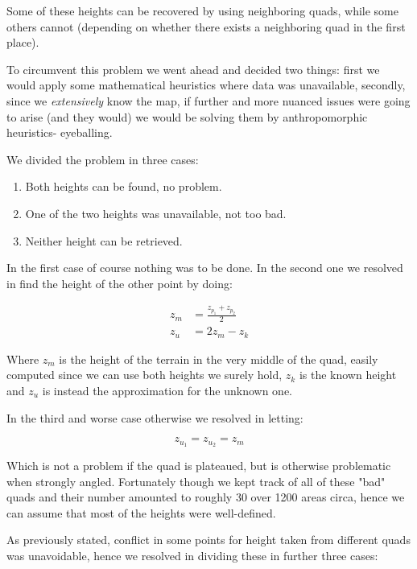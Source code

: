 \documentclass[9pt, a4paper]{IEEEtran}
\begin{document}
    Some of these heights can be recovered by using neighboring quads, while some others cannot (depending on whether there exists a neighboring quad in the first place).

    To circumvent this problem we went ahead and decided two things: first we would apply some mathematical heuristics where data was unavailable, secondly, since we \emph{extensively} know the map, if further and more nuanced issues were going to arise (and they would) we would be solving them by anthropomorphic heuristics- eyeballing.

    We divided the problem in three cases:

    \begin{enumerate}
        \item Both heights can be found, no problem.
        \item One of the two heights was unavailable, not too bad.
        \item Neither height can be retrieved.
    \end{enumerate}

    In the first case of course nothing was to be done.
    In the second one we resolved in find the height of the other point by doing:

    \begin{align*}
            z_m &= \frac{z_{p_1} + z_{p_2}}{2}\\
            z_u &= 2z_m - z_k
    \end{align*}
    
    Where $z_m$ is the height of the terrain in the very middle of the quad, easily computed since we can use both heights we surely hold, $z_k$ is the known height and $z_u$ is instead the approximation for the unknown one.

    In the third and worse case otherwise we resolved in letting:

    \begin{equation*}
        z_{u_1} = z_{u_2} = z_m
    \end{equation*}

    Which is not a problem if the quad is plateaued, but is otherwise problematic when strongly angled.
    Fortunately though we kept track of all of these "bad" quads and their number amounted to roughly 30 over 1200 areas circa, hence we can assume that most of the heights were well-defined.

    As previously stated, conflict in some points for height taken from different quads was unavoidable, hence we resolved in dividing these in further three cases:
    
\end{document}
